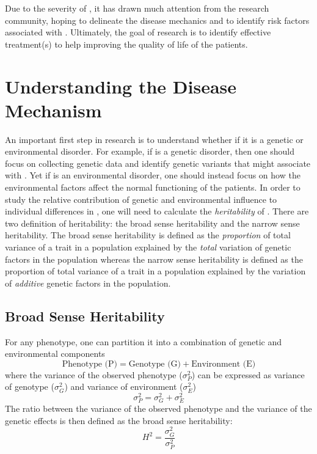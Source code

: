 	Due to the severity of , it has drawn much attention from the research community, hoping to delineate the disease mechanics and to identify risk factors associated with .
	Ultimately, the goal of  research is to identify effective treatment(s) to help improving the quality of life of the patients.
	
	\section{Understanding the Disease Mechanism}
	An important first step in  research is to understand whether if it is a genetic or environmental disorder. 
	For example, if  is a genetic disorder, then one should focus on collecting genetic data and identify genetic variants that might associate with .
	Yet if  is an environmental disorder, one should instead focus on how the environmental factors affect the normal functioning of the patients.
	In order to study the relative contribution of genetic and environmental influence to individual differences in , one will need to calculate the \emph{heritability} of .
	There are two definition of heritability: the broad sense heritability and the narrow sense heritability.
	The broad sense heritability is defined as the \emph{proportion} of total variance of a trait in a population explained by the \emph{total} variation of genetic factors in the population whereas the narrow sense heritability is defined as the proportion of total variance of a trait in a population explained by the variation of \emph{additive} genetic factors in the population.
	
	\subsection{Broad Sense Heritability}
	For any phenotype, one can partition it into a combination of genetic and environmental components \citep{Falconer1996}
	$$
	\text{Phenotype (P)}=\text{Genotype (G)}+\text{Environment (E)}
	$$
	where the variance of the observed phenotype ($\sigma_P^2$) can be expressed as variance of genotype ($\sigma_G^2$) and variance of environment ($\sigma_E^2$)
	$$
	\sigma_P^2=\sigma_G^2+\sigma_E^2
	$$
	The ratio between the variance of the observed phenotype and the variance of the genetic effects is then defined as the broad sense heritability:
	$$
	H^2=\frac{\sigma_G^2}{\sigma_P^2}
	$$
	

